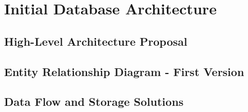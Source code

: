 \section{Initial Database Architecture}
\subsection{High-Level Architecture Proposal}
\subsection{Entity Relationship Diagram - First Version}
\subsection{Data Flow and Storage Solutions}
